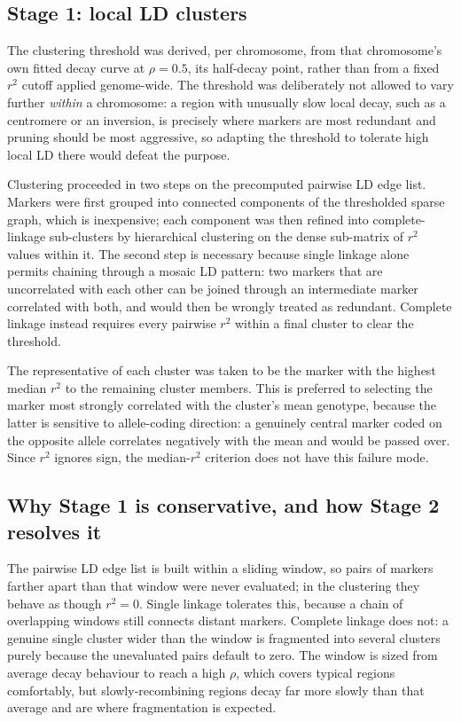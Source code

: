 \documentclass[11pt]{article}
\newcommand{\rsq}{\ensuremath{r^{2}}}
\begin{document}
\subsection{Stage 1: local LD clusters}
The clustering threshold was derived, per chromosome, from that chromosome's own
fitted decay curve at $\rho = 0.5$, its half-decay point, rather than from a
fixed \rsq{} cutoff applied genome-wide. The threshold was deliberately not
allowed to vary further \emph{within} a chromosome: a region with unusually slow
local decay, such as a centromere or an inversion, is precisely where markers
are most redundant and pruning should be most aggressive, so adapting the
threshold to tolerate high local LD there would defeat the purpose.

Clustering proceeded in two steps on the precomputed pairwise LD edge list.
Markers were first grouped into connected components of the thresholded sparse
graph, which is inexpensive; each component was then refined into
complete-linkage sub-clusters by hierarchical clustering on the dense sub-matrix
of \rsq{} values within it. The second step is necessary because single linkage
alone permits chaining through a mosaic LD pattern: two markers that are
uncorrelated with each other can be joined through an intermediate marker
correlated with both, and would then be wrongly treated as redundant. Complete
linkage instead requires every pairwise \rsq{} within a final cluster to clear
the threshold.

The representative of each cluster was taken to be the marker with the highest
median \rsq{} to the remaining cluster members. This is preferred to selecting
the marker most strongly correlated with the cluster's mean genotype, because
the latter is sensitive to allele-coding direction: a genuinely central marker
coded on the opposite allele correlates negatively with the mean and would be
passed over. Since \rsq{} ignores sign, the median-\rsq{} criterion does not have
this failure mode.

\subsection{Why Stage 1 is conservative, and how Stage 2 resolves it}
The pairwise LD edge list is built within a sliding window, so pairs of markers
farther apart than that window were never evaluated; in the clustering they
behave as though $\rsq = 0$. Single linkage tolerates this, because a chain of
overlapping windows still connects distant markers. Complete linkage does not:
a genuine single cluster wider than the window is fragmented into several
clusters purely because the unevaluated pairs default to zero. The window is
sized from average decay behaviour to reach a high $\rho$, which covers typical
regions comfortably, but slowly-recombining regions decay far more slowly than
that average and are where fragmentation is expected.
\end{document}
